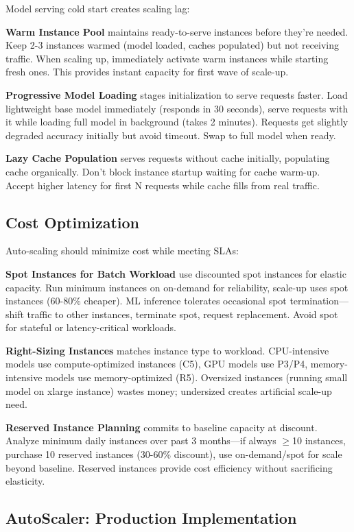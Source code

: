 Model serving cold start creates scaling lag:

\textbf{Warm Instance Pool} maintains ready-to-serve instances before they're needed. Keep 2-3 instances warmed (model loaded, caches populated) but not receiving traffic. When scaling up, immediately activate warm instances while starting fresh ones. This provides instant capacity for first wave of scale-up.

\textbf{Progressive Model Loading} stages initialization to serve requests faster. Load lightweight base model immediately (responds in 30 seconds), serve requests with it while loading full model in background (takes 2 minutes). Requests get slightly degraded accuracy initially but avoid timeout. Swap to full model when ready.

\textbf{Lazy Cache Population} serves requests without cache initially, populating cache organically. Don't block instance startup waiting for cache warm-up. Accept higher latency for first N requests while cache fills from real traffic.

\subsection{Cost Optimization}

Auto-scaling should minimize cost while meeting SLAs:

\textbf{Spot Instances for Batch Workload} use discounted spot instances for elastic capacity. Run minimum instances on on-demand for reliability, scale-up uses spot instances (60-80\% cheaper). ML inference tolerates occasional spot termination---shift traffic to other instances, terminate spot, request replacement. Avoid spot for stateful or latency-critical workloads.

\textbf{Right-Sizing Instances} matches instance type to workload. CPU-intensive models use compute-optimized instances (C5), GPU models use P3/P4, memory-intensive models use memory-optimized (R5). Oversized instances (running small model on xlarge instance) wastes money; undersized creates artificial scale-up need.

\textbf{Reserved Instance Planning} commits to baseline capacity at discount. Analyze minimum daily instances over past 3 months---if always \ensuremath{\geq}10 instances, purchase 10 reserved instances (30-60\% discount), use on-demand/spot for scale beyond baseline. Reserved instances provide cost efficiency without sacrificing elasticity.

\subsection{AutoScaler: Production Implementation}

